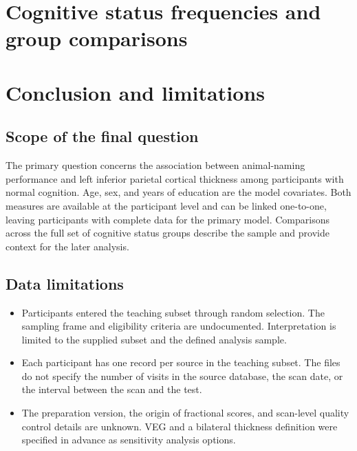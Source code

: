 \documentclass[11pt]{article}
\begin{document}
\section{Cognitive status frequencies and group comparisons}
\clearpage

\section{Conclusion and limitations}
\subsection*{Scope of the final question}
The primary question concerns the association between animal-naming
performance and left inferior parietal cortical thickness among
participants with normal cognition. Age, sex, and years of education
are the model covariates. Both measures are available at the
participant level and can be linked one-to-one, leaving \NModelNormal{}
participants with complete data for the primary model. Comparisons
across the full set of cognitive status groups describe the sample
and provide context for the later analysis.

\subsection*{Data limitations}
\begin{itemize}
\item Participants entered the teaching subset through random selection. The sampling frame and eligibility criteria are undocumented.
Interpretation is limited to the supplied subset and the defined
analysis sample.
\item Each participant has one record per source in the teaching
subset. The files do not specify the number of visits in the source
database, the scan date, or the interval between the scan and the test.
\item The preparation version, the origin of fractional scores, and
scan-level quality control details are unknown. VEG and a bilateral
thickness definition were specified in advance as sensitivity analysis
options.
\end{itemize}
\end{document}
